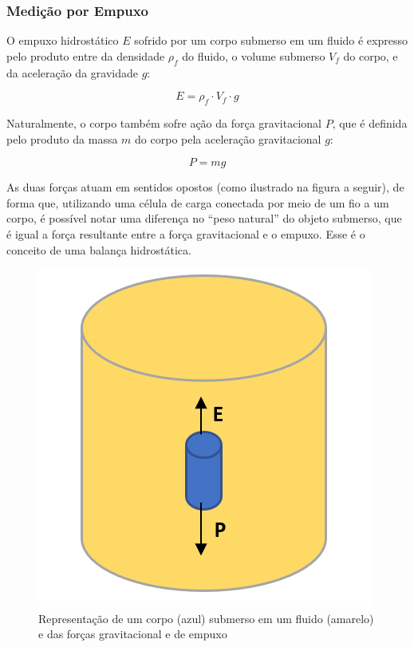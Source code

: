 \subsubsection{Medição por Empuxo}

O empuxo hidrostático \(E\) sofrido por um corpo submerso em um fluido é expresso pelo produto entre da densidade \(\rho_f\) do fluido, o volume submerso \(V_f\) do corpo, e da aceleração da gravidade \(g\): 

\begin{equation}
    E = \rho_f \cdot V_f \cdot g
\end{equation}

Naturalmente, o corpo também sofre ação da força gravitacional \(P\), que é definida pelo produto da massa \(m\) do corpo pela aceleração gravitacional \(g\):

\begin{equation}
    P = mg
\end{equation}

As duas forças atuam em sentidos opostos (como ilustrado na figura a seguir), de forma que, utilizando uma célula de carga conectada por meio de um fio a um corpo, é possível notar uma diferença no “peso natural” do objeto submerso, que é igual a força resultante entre a força gravitacional e o empuxo. Esse é o conceito de uma balança hidrostática.

\begin{figure}[h]
    \centering
    \includegraphics[scale=0.35]{figuras/projeto/hardware/empuxo.PNG}
    \caption{Representação de um corpo (azul) submerso em um fluido (amarelo) e das forças gravitacional e de empuxo}
    \label{fig:empuxo}
\end{figure}

